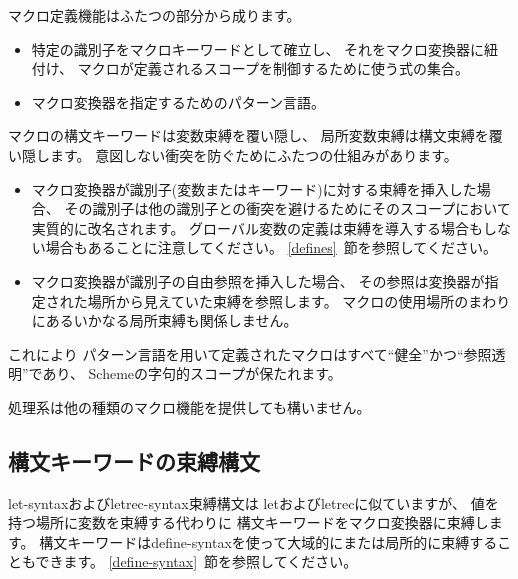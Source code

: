 マクロ定義機能はふたつの部分から成ります。

\begin{itemize}
\item 特定の識別子をマクロキーワードとして確立し、
それをマクロ変換器に紐付け、
マクロが定義されるスコープを制御するために使う式の集合。

\item マクロ変換器を指定するためのパターン言語。
\end{itemize}

マクロの構文キーワードは変数束縛を覆い隠し、
局所変数束縛は構文束縛を覆い隠します。
意図しない衝突を防ぐためにふたつの仕組みがあります。

\begin{itemize}

\item マクロ変換器が識別子(変数またはキーワード)に対する束縛を挿入した場合、
その識別子は他の識別子との衝突を避けるためにそのスコープにおいて実質的に改名されます。
グローバル変数の定義は束縛を導入する場合もしない場合もあることに注意してください。
\ref{defines}~節を参照してください。

\item マクロ変換器が識別子の自由参照を挿入した場合、
その参照は変換器が指定された場所から見えていた束縛を参照します。
マクロの使用場所のまわりにあるいかなる局所束縛も関係しません。

\end{itemize}

これにより
パターン言語を用いて定義されたマクロはすべて``健全''かつ``参照透明''であり、
Schemeの字句的スコープが保たれます。\cite{Kohlbecker86,
hygienic,Bawden88,macrosthatwork,syntacticabstraction}

処理系は他の種類のマクロ機能を提供しても構いません。

\subsection{構文キーワードの束縛構文}
\label{bindsyntax}

{\cf let-syntax}および{\cf letrec-syntax}束縛構文は
{\cf let}および{\cf letrec}に似ていますが、
値を持つ場所に変数を束縛する代わりに
構文キーワードをマクロ変換器に束縛します。
構文キーワードは{\cf define-syntax}を使って大域的にまたは局所的に束縛することもできます。
\ref{define-syntax}~節を参照してください。

